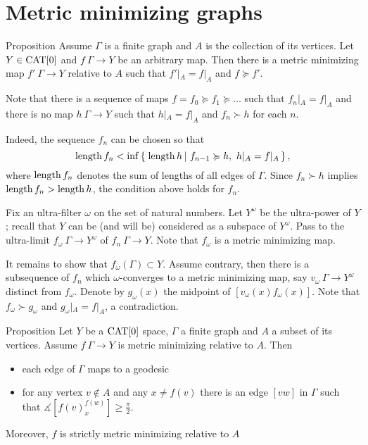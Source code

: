 \documentclass[a4paper,10pt]{amsart}
\begin{document}
\section{Metric minimizing graphs}



\begin{thm}{Proposition}
Assume $\Gamma$ is a  finite graph and $A$ is the collection of its vertices.
Let $Y\in\mathop{\rm CAT}\nolimits[0]$ and $f\:\Gamma\to Y$ be an arbitrary map.
Then there is a metric minimizing map $f'\:\Gamma\to Y$ relative to $A$ such that
$f'|_A=f|_A$ and 
$f\succcurlyeq f'$.
\end{thm} 

 Note that there is a sequence of maps $f=f_0\succcurlyeq f_1\succcurlyeq\dots$ such that $f_n|_A=f|_A$ and there is no map $h\:\Gamma\to Y$ such that $h|_A=f|_A$ and $f_n\succ h$ for each $n$.

Indeed, the sequence $f_n$ can be chosen so that
\[\length f_n<\inf\set{\length h}{f_{n-1}\succcurlyeq h,\ h|_A=f|_A},\]
where $\mathop{\rm length}\nolimits f_n$ denotes the sum of lengths of all edges of $\Gamma$. %
Since $f_n\succ h$ implies $\mathop{\rm length}\nolimits f_n>\mathop{\rm length}\nolimits h$, 
the condition above holds for $f_n$.

Fix an ultra-filter $\omega$ on the set of natural numbers.
Let $Y^\omega$ be the ultra-power of $Y$;
recall that $Y$ can be (and will be) considered as a subspace of $Y^\omega$.
Pass to the ultra-limit $f_\omega\:\Gamma\to Y^\omega$ 
of $f_n\:\Gamma\to Y$.
Note that $f_\omega$ is a metric minimizing map.

It remains to show that $f_\omega(\Gamma)\subset Y$.
Assume contrary, then there is a subsequence of $f_n$ which $\omega$-converges to a metric minimizing map, say $v_\omega\:\Gamma\to Y^\omega$ distinct from $f_\omega$.
Denote by $g_\omega(x)$ the midpoint of $[v_\omega(x)f_\omega(x)]$.
Note that $f_\omega\succ g_\omega$ and $g_\omega|_A=f|_A$, a contradiction.
\qeds

\begin{thm}{Proposition}\label{prop:metric-min-graph}
Let $Y$ be a $\mathop{\rm CAT}\nolimits[0]$ space, 
$\Gamma$ a finite  graph and $A$ a subset of its vertices.
Assume $f\:\Gamma\to Y$ is metric minimizing relative to $A$.
Then
\begin{itemize}
\item each edge of $\Gamma$ maps to a geodesic
\item for any vertex $v\notin A$ and any $x\ne f(v)$
there is an edge  $[vw]$ in $\Gamma$ such that
$\measuredangle[f(v)^{f(w)}_x]\ge \tfrac\pi2$.
\end{itemize}
Moreover, $f$ is strictly metric minimizing relative to $A$ 
\end{thm}
\end{document}
